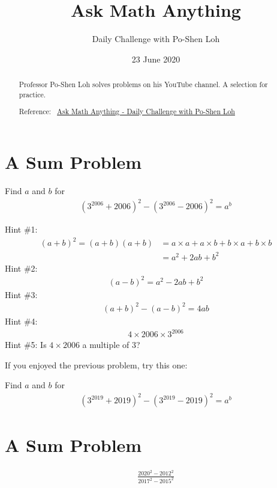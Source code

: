 \documentclass[12pt]{article}
\title{Ask Math Anything}
\author{Daily Challenge with Po-Shen Loh}
\date{23 June 2020}
\begin{document}
\begin{minipage}{\textwidth}
\maketitle
\begin{abstract}
Professor Po-Shen Loh solves problems on his YouTube channel. A selection for practice. 

Reference:~ 
\href{https://www.youtube.com/channel/UCf78EJOm4wQ4xXwSS15PuxQ}{Ask Math Anything - Daily Challenge with Po-Shen Loh}
\end{abstract}
\end{minipage}


\section{A Sum Problem}
Find $a$ and $b$ for
\begin{align*}
(3^{2006} + 2006)^2 - (3^{2006} - 2006)^2 = a^{b}
\end{align*}
\begin{answer}
Hint \#1: 
\begin{align*}
(a+b)^2 = (a+b)(a+b) 
  & = a \times a + a \times b + b \times a + b \times b \\
  & = a^2 + 2 ab + b^2
\end{align*}
Hint \#2:
\begin{align*}
(a-b)^2 = a^2 - 2 ab + b^2
\end{align*}
Hint \#3:
\begin{align*}
(a+b)^2 - (a-b)^2 =  4 ab
\end{align*}
Hint \#4:
\begin{align*}
4 \times 2006 \times 3^{2006}
\end{align*}
Hint \#5: Is $4 \times 2006$ a multiple of $3$?

\bigskip

If you enjoyed the previous problem, try this one:
\bigskip

Find $a$ and $b$ for
\begin{align*}
(3^{2019} + 2019)^2 - (3^{2019} - 2019)^2 = a^{b}
\end{align*}
\end{answer}


\section{A Sum Problem}
\begin{align*}
\frac{2020^2 - 2012^2}{2017^2 - 2015^2}
\end{align*}
\end{document}
